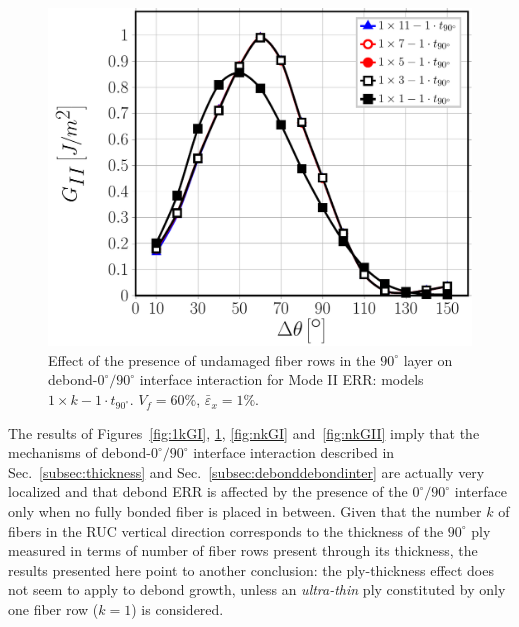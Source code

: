 \documentclass[Review,sagev,times]{sagej}
\begin{document}
\begin{figure}[!htb]
\centering
\includegraphics[height=0.375\textheight]{1xk-1-vf60-GII.pdf}
\caption{Effect of the presence of undamaged fiber rows in the $90^{\circ}$ layer on debond-$0^{\circ}/90^{\circ}$ interface interaction for Mode II ERR: models $1\times k-1\cdot t_{90^{\circ}}$. $V_{f}=60\%$, $\bar{\varepsilon}_{x}=1\%$.}\label{fig:1kGII}
\end{figure}

The results of Figures~\ref{fig:1kGI}, \ref{fig:1kGII}, \ref{fig:nkGI} and~\ref{fig:nkGII} imply that the mechanisms of debond-$0^{\circ}/90^{\circ}$ interface interaction described in Sec.~\ref{subsec:thickness} and Sec.~\ref{subsec:debonddebondinter} are actually very localized and that debond ERR is affected by the presence of the $0^{\circ}/90^{\circ}$ interface only when no fully bonded fiber is placed in between. Given that the number $k$ of fibers in the RUC vertical direction corresponds to the thickness of the $90^{\circ}$ ply measured in terms of number of fiber rows present through its thickness, the results presented here point to another conclusion: the ply-thickness effect does not seem to apply to debond growth, unless an \textit{ultra-thin} ply constituted by only one fiber row ($k=1$) is considered.\\
\end{document}
